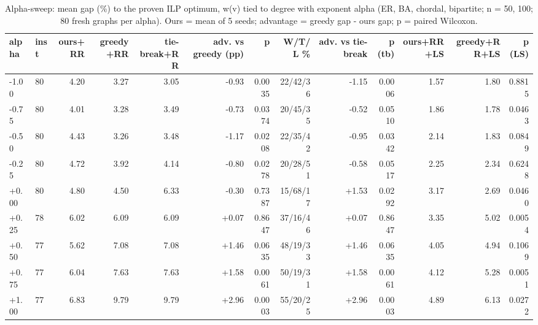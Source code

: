 \begin{table}[t]
\centering
\caption{Alpha-sweep: mean gap (\%) to the proven ILP optimum, w(v) tied to degree with exponent alpha (ER, BA, chordal, bipartite; n = 50, 100; 80 fresh graphs per alpha). Ours = mean of 5 seeds; advantage = greedy gap - ours gap; p = paired Wilcoxon.}
\label{tab:alpha_sweep}
\scriptsize
\begin{tabular}{llrrrrrrrrrrr}
\toprule
alpha & inst & ours+RR & greedy+RR & tie-break+RR & adv. vs greedy (pp) & p & W/T/L \% & adv. vs tie-break & p (tb) & ours+RR+LS & greedy+RR+LS & p (LS) \\
\midrule
-1.00 & 80 & 4.20 & 3.27 & 3.05 & -0.93 & 0.0035 & 22/42/36 & -1.15 & 0.0006 & 1.57 & 1.80 & 0.8815 \\
-0.75 & 80 & 4.01 & 3.28 & 3.49 & -0.73 & 0.0374 & 20/45/35 & -0.52 & 0.0510 & 1.86 & 1.78 & 0.0463 \\
-0.50 & 80 & 4.43 & 3.26 & 3.48 & -1.17 & 0.0208 & 22/35/42 & -0.95 & 0.0342 & 2.14 & 1.83 & 0.0849 \\
-0.25 & 80 & 4.72 & 3.92 & 4.14 & -0.80 & 0.0278 & 20/28/51 & -0.58 & 0.0517 & 2.25 & 2.34 & 0.6248 \\
+0.00 & 80 & 4.80 & 4.50 & 6.33 & -0.30 & 0.7387 & 15/68/17 & +1.53 & 0.0292 & 3.17 & 2.69 & 0.0460 \\
+0.25 & 78 & 6.02 & 6.09 & 6.09 & +0.07 & 0.8647 & 37/16/46 & +0.07 & 0.8647 & 3.35 & 5.02 & 0.0054 \\
+0.50 & 77 & 5.62 & 7.08 & 7.08 & +1.46 & 0.0635 & 48/19/33 & +1.46 & 0.0635 & 4.05 & 4.94 & 0.1069 \\
+0.75 & 77 & 6.04 & 7.63 & 7.63 & +1.58 & 0.0061 & 50/19/31 & +1.58 & 0.0061 & 4.12 & 5.28 & 0.0051 \\
+1.00 & 77 & 6.83 & 9.79 & 9.79 & +2.96 & 0.0003 & 55/20/25 & +2.96 & 0.0003 & 4.89 & 6.13 & 0.0272 \\
\bottomrule
\end{tabular}
\end{table}
